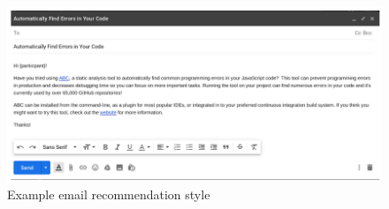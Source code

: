 \begin{figure}[H]
\centering
	\includegraphics[width=\textwidth]{Appendix-C/images/email-rec.png}
	\caption{Example email recommendation style}	
	\label{fig:email-rec} 
\end{figure}
